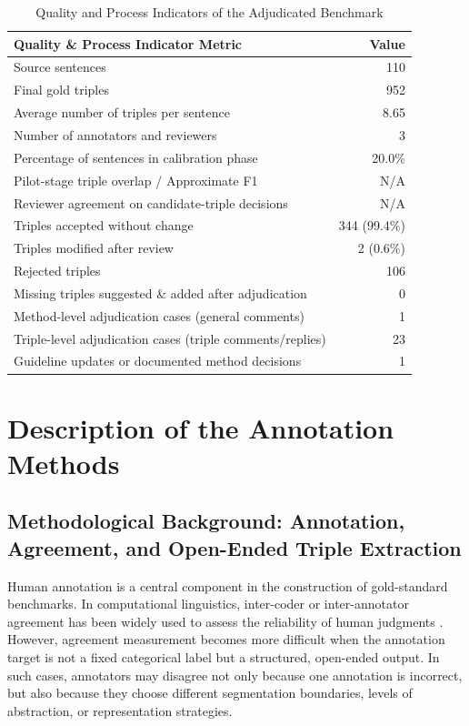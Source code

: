 \documentclass[conference]{IEEEtran}
\begin{document}
\begin{table}[htbp]
\caption{Quality and Process Indicators of the Adjudicated Benchmark}
\label{tab:quality_indicators}
\centering
\small
\begin{tabular}{lr}
\toprule
\textbf{Quality \& Process Indicator Metric} & \textbf{Value} \\
\midrule
Source sentences & 110 \\
Final gold triples & 952 \\
Average number of triples per sentence & 8.65 \\
Number of annotators and reviewers & 3 \\
Percentage of sentences in calibration phase & 20.0\% \\
Pilot-stage triple overlap / Approximate F1 & N/A \\
Reviewer agreement on candidate-triple decisions & N/A \\
Triples accepted without change & 344 (99.4\%) \\
Triples modified after review & 2 (0.6\%) \\
Rejected triples & 106 \\
Missing triples suggested \& added after adjudication & 0 \\
Method-level adjudication cases (general comments) & 1 \\
Triple-level adjudication cases (triple comments/replies) & 23 \\
Guideline updates or documented method decisions & 1 \\
\bottomrule
\end{tabular}
\end{table}


\section{Description of the Annotation Methods}


\subsection{Methodological Background: Annotation, Agreement, and Open-Ended Triple Extraction}

Human annotation is a central component in the construction of gold-standard benchmarks. In computational linguistics, inter-coder or inter-annotator agreement has been widely used to assess the reliability of human judgments \cite{artstein2008intercoder}. However, agreement measurement becomes more difficult when the annotation target is not a fixed categorical label but a structured, open-ended output. In such cases, annotators may disagree not only because one annotation is incorrect, but also because they choose different segmentation boundaries, levels of abstraction, or representation strategies.
\end{document}
